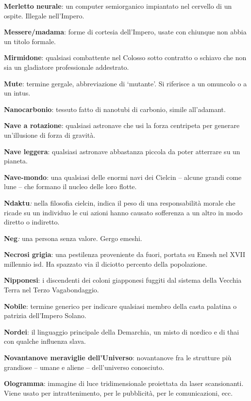 \textbf{Merletto neurale}: un computer semiorganico impiantato nel
cervello di un ospite. Illegale nell'Impero.

\textbf{Messere/madama}: forme di cortesia dell'Impero, usate con
chiunque non abbia un titolo formale.

\textbf{Mirmidone}: qualsiasi combattente nel Colosso sotto contratto o
schiavo che non sia un gladiatore professionale addestrato.

\textbf{Mute}: termine gergale, abbreviazione di `mutante'. Si riferisce
a un omuncolo o a un intus.

\textbf{Nanocarbonio}: tessuto fatto di nanotubi di carbonio, simile
all'adamant.

\textbf{Nave a rotazione}: qualsiasi astronave che usi la forza
centripeta per generare un'illusione di forza di gravità.

\textbf{Nave leggera}: qualsiasi astronave abbastanza piccola da poter
atterrare su un pianeta.

\textbf{Nave-mondo}: una qualsiasi delle enormi navi dei Cielcin --
alcune grandi come lune -- che formano il nucleo delle loro flotte.

\textbf{Ndaktu}\emph{:} nella filosofia cielcin, indica il peso di una
responsabilità morale che ricade su un individuo le cui azioni hanno
causato sofferenza a un altro in modo diretto o indiretto.

\textbf{Neg}\emph{:} una persona senza valore. Gergo emeshi.

\textbf{Necrosi grigia}: una pestilenza proveniente da fuori, portata su
Emesh nel XVII millennio \foreignlanguage{italian}{isd}. Ha spazzato via
il diciotto percento della popolazione.

\textbf{Nipponesi}: i discendenti dei coloni giapponesi fuggiti dal
sistema della Vecchia Terra nel Terzo Vagabondaggio.

\textbf{Nobile}: termine generico per indicare qualsiasi membro della
casta palatina o patrizia dell'Impero Solano.

\textbf{Nordei}: il linguaggio principale della Demarchia, un misto di
nordico e di thai con qualche influenza slava.

\textbf{Novantanove meraviglie dell'Universo}: novantanove fra le
strutture più grandiose -- umane e aliene -- dell'universo conosciuto.

\textbf{Ologramma}: immagine di luce tridimensionale proiettata da laser
scansionanti. Viene usato per intrattenimento, per le pubblicità, per le
comunicazioni, ecc.

